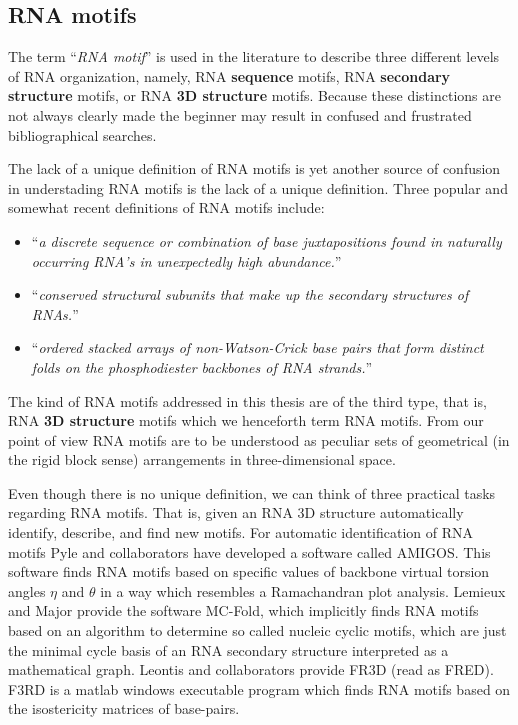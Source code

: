 \subsection{RNA motifs}
The term ``\textit{RNA motif}'' is  used in the literature to describe
three   different   levels    of   RNA   organization,   namely,   RNA
\textbf{sequence} motifs, RNA  \textbf{secondary structure} motifs, or
RNA \textbf{3D structure} motifs.   Because these distinctions are not
always clearly made the beginner may result in confused and frustrated
bibliographical searches.

The lack of a unique definition of RNA motifs is yet another source of
confusion  in  understading  RNA  motifs  is  the  lack  of  a  unique
definition.  Three  popular and  somewhat  recent  definitions of  RNA
motifs include:
\begin{itemize}
\item{``\textit{a discrete sequence or combination of
    base  juxtapositions   found  in  naturally   occurring  RNA's  in
    unexpectedly high abundance.}''\cite{moore1999}}
\item{``\textit{conserved structural subunits that make
    up the secondary structures of RNAs.}''\cite{holbrook2005}}
\item{``\textit{ordered   stacked    arrays   of
    non-Watson-Crick  base  pairs  that  form distinct  folds  on  the
    phosphodiester backbones of RNA strands.}''\cite{leontis2003}}
\end{itemize}

The  kind of RNA  motifs addressed in this
thesis are of the third type, that is, RNA \textbf{3D structure}
motifs  which we henceforth term RNA  motifs.
From our point of view RNA motifs are to be understood as  peculiar
sets of geometrical  (in the rigid block sense)  arrangements in
three-dimensional space.

Even  though there  is no  unique definition,  we can  think  of three
practical  tasks regarding  RNA  motifs.   That is,  given  an RNA  3D
structure automatically identify, describe,  and find new motifs.  For
automatic  identification of  RNA motifs  Pyle and  collaborators have
developed  a software called  AMIGOS. This  software finds  RNA motifs
based on  specific values of backbone virtual  torsion angles $\eta$
and  $\theta$  \cite{olson1980, malathi1985,  duarte2003} in  a  way  which
resembles   a   Ramachandran  plot   analysis.    Lemieux  and   Major
\cite{lemieux2006}  provide  the  software MC-Fold,  which  implicitly
finds RNA motifs based on  an algorithm to determine so called nucleic
cyclic  motifs, which  are  just the  minimal  cycle basis  of an  RNA
secondary  structure  interpreted as  a  mathematical graph.   Leontis
\cite{nasalean2009}  and collaborators  provide FR3D  (read  as FRED).
F3RD is  a matlab  windows executable program  which finds  RNA motifs
based on the isostericity matrices of base-pairs.

